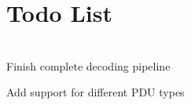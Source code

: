 \chapter{Todo List }
\hypertarget{todo}{}\label{todo}

\begin{DoxyRefList}
\item[Class \doxylink{classDecode}{Decode} ]\hfill \\
\label{todo__todo000001}%
%
Finish complete decoding pipeline 



Add support for different PDU types
\end{DoxyRefList}
